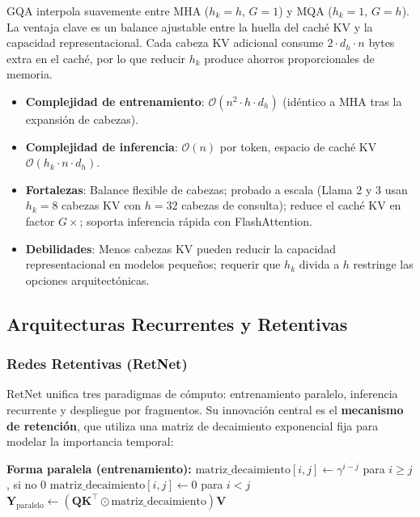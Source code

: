 GQA interpola suavemente entre MHA ($h_k = h$, $G = 1$) y MQA ($h_k = 1$, $G = h$). La ventaja clave es un balance ajustable entre la huella del caché KV y la capacidad representacional. Cada cabeza KV adicional consume $2 \cdot d_h \cdot n$ bytes extra en el caché, por lo que reducir $h_k$ produce ahorros proporcionales de memoria.

\begin{itemize}[leftmargin=*]
    \item \textbf{Complejidad de entrenamiento}: $\mathcal{O}(n^2 \cdot h \cdot d_h)$ (idéntico a MHA tras la expansión de cabezas).
    \item \textbf{Complejidad de inferencia}: $\mathcal{O}(n)$ por token, espacio de caché KV $\mathcal{O}(h_k \cdot n \cdot d_h)$.
    \item \textbf{Fortalezas}: Balance flexible de cabezas; probado a escala (Llama 2 y 3 usan $h_k = 8$ cabezas KV con $h = 32$ cabezas de consulta); reduce el caché KV en factor $G \times$; soporta inferencia rápida con FlashAttention.
    \item \textbf{Debilidades}: Menos cabezas KV pueden reducir la capacidad representacional en modelos pequeños; requerir que $h_k$ divida a $h$ restringe las opciones arquitectónicas.
\end{itemize}

\subsection{Arquitecturas Recurrentes y Retentivas}

\subsubsection{Redes Retentivas (RetNet)}
RetNet \citep{sun_retentive_2023} unifica tres paradigmas de cómputo: entrenamiento paralelo, inferencia recurrente y despliegue por fragmentos. Su innovación central es el \textbf{mecanismo de retención}, que utiliza una matriz de decaimiento exponencial fija para modelar la importancia temporal:

\begin{algorithmic}[1]
\State \textbf{Forma paralela (entrenamiento):}
\State $\text{matriz\_decaimiento}[i,j] \gets \gamma^{i-j}$ para $i \geq j$, si no $0$ 
\State $\text{matriz\_decaimiento}[i,j] \gets 0$ para $i < j$ 
\State $\mathbf{Y}_{\text{paralelo}} \gets (\mathbf{Q}\mathbf{K}^\top \odot \text{matriz\_decaimiento}) \mathbf{V}$ 
\end{algorithmic}

